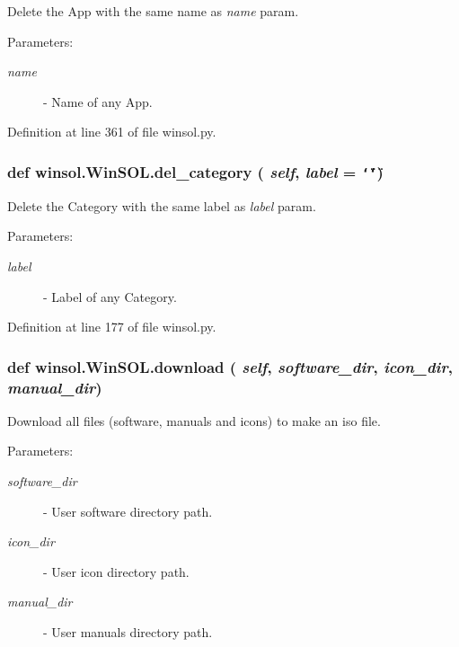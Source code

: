 Delete the App with the same name as {\em name\/} param. 

\begin{Desc}
\item[Parameters:]
\begin{description}
\item[{\em name}]- Name of any App. \end{description}
\end{Desc}


Definition at line 361 of file winsol.py.\hypertarget{classwinsol_1_1WinSOL_d9aaa8e185bf623559e556ae91f9dfb6}{
\subsubsection[del\_\-category]{\setlength{\rightskip}{0pt plus 5cm}def winsol.Win\-SOL.del\_\-category ( {\em self},  {\em label} = {\tt \char`\"{}\char`\"{}})}}
\label{classwinsol_1_1WinSOL_d9aaa8e185bf623559e556ae91f9dfb6}


Delete the Category with the same label as {\em label\/} param. 

\begin{Desc}
\item[Parameters:]
\begin{description}
\item[{\em label}]- Label of any Category. \end{description}
\end{Desc}


Definition at line 177 of file winsol.py.\hypertarget{classwinsol_1_1WinSOL_978c4164171d6201aec2131ec4c57279}{
\subsubsection[download]{\setlength{\rightskip}{0pt plus 5cm}def winsol.Win\-SOL.download ( {\em self},  {\em software\_\-dir},  {\em icon\_\-dir},  {\em manual\_\-dir})}}
\label{classwinsol_1_1WinSOL_978c4164171d6201aec2131ec4c57279}


Download all files (software, manuals and icons) to make an iso file. 

\begin{Desc}
\item[Parameters:]
\begin{description}
\item[{\em software\_\-dir}]- User software directory path. \item[{\em icon\_\-dir}]- User icon directory path. \item[{\em manual\_\-dir}]- User manuals directory path. \end{description}
\end{Desc}


